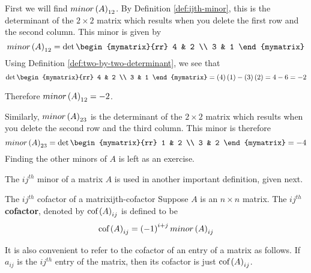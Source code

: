 \begin{solution} First we will find $minor\left(A\right) _{12}$. By Definition
\ref{def:ijth-minor}, this is the determinant of the $2\times 2$ matrix
which results when you delete the first row and the second column. This
minor is given by
\begin{equation*}
minor \tup{A}_{12}
=
\det \begin{mymatrix}{rr}
4 & 2 \\
3 & 1
\end{mymatrix}
\end{equation*}
Using Definition \ref{def:two-by-two-determinant}, we see that 
\begin{equation*}
\det \begin{mymatrix}{rr}
4 & 2 \\
3 & 1
\end{mymatrix} = \tup{4}\tup{1} - \tup{3}\tup{2} = 4 - 6 = -2
\end{equation*}

Therefore $minor \left(A\right)_{12} = -2$. 

Similarly, $minor\left(A\right)_{23}$ is the determinant of the $2\times 2$ matrix
which results when you delete the second row and the third column. This
minor is therefore
\begin{equation*}
minor \tup{A}_{23} 
=
\det \begin{mymatrix}{rr}
1 & 2 \\
3 & 2
\end{mymatrix} = -4
\end{equation*}
Finding the other minors of $A$ is left as an exercise. 
\end{solution}

The $ij^{th}$ minor of a matrix $A$ is used in another important definition, given next.

\begin{definition}{The $ij^{th}$ cofactor of a matrix}{ijth-cofactor}
Suppose $A$ is an $n\times n$ matrix. The $ij^{th}$ \textbf{cofactor}, denoted by $\mbox{\rm cof}\left(A\right) _{ij}$ is
defined to be 
\begin{equation*}
\mbox{\rm cof}\left(A\right) _{ij} = \left(-1\right) ^{i+j} minor\left(A\right)_{ij} 
\end{equation*}
\end{definition}

It is also convenient to refer to the
cofactor of an entry of a matrix as follows. If $a_{ij}$ is the $ij^{th}$ entry of the
matrix, then its cofactor is just $\mbox{\rm cof}\left(A\right) _{ij}$.

